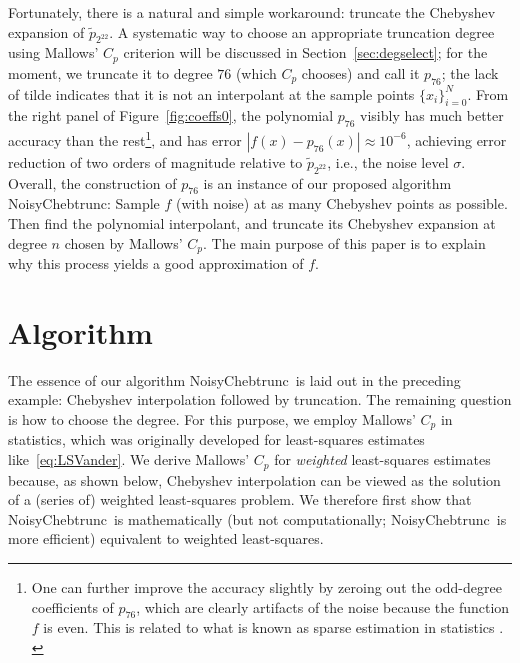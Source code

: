 \documentclass[final,onefignum,onetabnum]{siamart220329}
\def\mainalg{NoisyChebtrunc}
\begin{document}
Fortunately, there is a natural and simple workaround: truncate the Chebyshev expansion of $\tilde p_{2^{22}}$. 
A systematic way to choose an appropriate truncation degree using Mallows' $C_p$ criterion will be discussed in Section~\ref{sec:degselect}; for the moment, we truncate it to degree $76$ (which $C_p$ chooses) and call it $p_{76}$; 
the lack of tilde indicates that it is not an interpolant at the sample points $\{x_i\}_{i=0}^N$. 
From the right panel of Figure~\ref{fig:coeffs0}, the polynomial $p_{76}$ visibly has much better accuracy than the rest\footnote{One can further improve the accuracy slightly by zeroing out the odd-degree coefficients of $p_{76}$, which are clearly artifacts of the noise because the function $f$ is even. This is related to what is known as sparse estimation in statistics \cite{hastie2015statistical}.
	\label{fnlabel}}, and has error $|f(x)-p_{76}(x)| \approx 10^{-6}$, achieving error reduction of two orders of magnitude relative to $\tilde p_{2^{22}}$, {i.e., the noise level $\sigma$}. 
Overall, the construction of $p_{76}$ is an instance of our proposed algorithm \mainalg: 
Sample $f$ (with noise) at as many Chebyshev points as possible. Then find the polynomial interpolant, and truncate its Chebyshev expansion at degree $n$ chosen by Mallows' $C_p$. 
The main purpose of this paper is to explain why this process yields a good approximation of $f$. 

\section{Algorithm} The essence of our algorithm \mainalg\ is laid out in the preceding example: Chebyshev interpolation followed by truncation. The remaining question is how to choose the degree. 
For this purpose, we employ Mallows' $C_p$ \cite{mallows2000some} in statistics, which was originally developed for least-squares estimates like~\eqref{eq:LSVander}.
We derive Mallows' $C_p$ for \emph{weighted} least-squares estimates because, as shown below, Chebyshev interpolation can be viewed as the solution of a (series of) weighted least-squares problem. 
We therefore first show that \mainalg\ is mathematically (but not computationally; \mainalg\ is more efficient) equivalent to weighted least-squares. 
\end{document}
